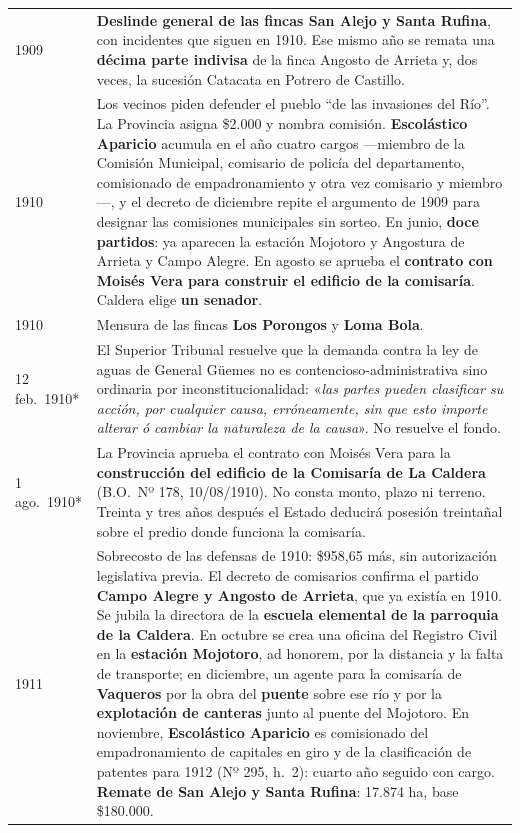 \begin{longtable}{@{}p{2.7cm}p{10.3cm}@{}}
1909 & \textbf{Deslinde general de las fincas San Alejo y Santa Rufina}, con incidentes que siguen en 1910. Ese mismo año se remata una \textbf{décima parte indivisa} de la finca Angosto de Arrieta y, dos veces, la sucesión Catacata en Potrero de Castillo. \\
1910 & Los vecinos piden defender el pueblo ``de las invasiones del Río''. La Provincia asigna \$2.000 y nombra comisión. \textbf{Escolástico Aparicio}\index{Aparicio, Escolástico M.} acumula en el año cuatro cargos ---miembro de la Comisión Municipal, comisario de policía del departamento, comisionado de empadronamiento y otra vez comisario y miembro---, y el decreto de diciembre repite el argumento de 1909 para designar las comisiones municipales sin sorteo. En junio, \textbf{doce partidos}: ya aparecen la estación Mojotoro y Angostura de Arrieta y Campo Alegre. En agosto se aprueba el \textbf{contrato con Moisés Vera para construir el edificio de la comisaría}. Caldera elige \textbf{un senador}. \\
1910 & Mensura de las fincas \textbf{Los Porongos} y \textbf{Loma Bola}. \\
12 feb.\ 1910* & El Superior Tribunal resuelve que la demanda contra la ley de aguas de General Güemes no es contencioso-administrativa sino ordinaria por inconstitucionalidad: «\textit{las partes pueden clasificar su acción, por cualquier causa, erróneamente, sin que esto importe alterar ó cambiar la naturaleza de la causa}». No resuelve el fondo. \\
1 ago.\ 1910* & La Provincia aprueba el contrato con Moisés Vera para la \textbf{construcción del edificio de la Comisaría de La Caldera} (B.O.\ Nº 178, 10/08/1910). No consta monto, plazo ni terreno. Treinta y tres años después el Estado deducirá posesión treintañal sobre el predio donde funciona la comisaría. \\
1911 & Sobrecosto de las defensas de 1910: \$958,65 más, sin autorización legislativa previa. El decreto de comisarios confirma el partido \textbf{Campo Alegre y Angosto de Arrieta}, que ya existía en 1910. Se jubila la directora de la \textbf{escuela elemental de la parroquia de la Caldera}. En octubre se crea una oficina del Registro Civil en la \textbf{estación Mojotoro}, ad honorem, por la distancia y la falta de transporte; en diciembre, un agente para la comisaría de \textbf{Vaqueros} por la obra del \textbf{puente} sobre ese río y por la \textbf{explotación de canteras} junto al puente del Mojotoro. En noviembre, \textbf{Escolástico Aparicio}\index{Aparicio, Escolástico M.} es comisionado del empadronamiento de capitales en giro y de la clasificación de patentes para 1912 (Nº 295, h.\ 2): cuarto año seguido con cargo. \textbf{Remate de San Alejo y Santa Rufina}: 17.874 ha, base \$180.000. \\

\end{longtable}
